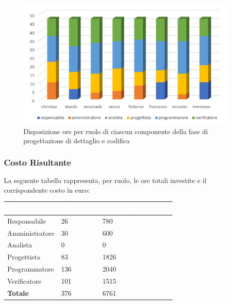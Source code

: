\begin{figure}[h!]
\centering
\caption{Disposizione ore per ruolo di ciascun componente della fase di progettazione di dettaglio e codifica}
\includegraphics[scale=2.5]{sezioni/Istogrammi/IstogrammaDiDettaglio.png}
\end{figure}

\subsubsection{Costo Risultante}
La seguente tabella rappresenta, per ruolo, le ore totali investite e il corrispondente costo in euro:
{
\renewcommand{\arraystretch}{2}
\begin{table}[h]
\centering
\caption{Tabella del costo risultante della Programmazione di Dettaglio e Codifica}
\begin{longtable}{ C{3cm} C{2cm} C{4cm}}
	\textcolor{white}{\textbf{Ruolo}} & 
	\textcolor{white}{\textbf{Totale ore}} & 
	\textcolor{white}{\textbf{Costo ruolo in euro}}\\	
\endhead
        
        Responsabile & 26 & 780 \\
        Amministratore & 30 & 600 \\
        Analista & 0 & 0 \\
        Progettista & 83 & 1826 \\
        Programmatore & 136 & 2040 \\
        Verificatore & 101 & 1515\\
        \textbf{Totale} & 376 & 6761 \\
		
	\end{longtable}
\end{table}
}

